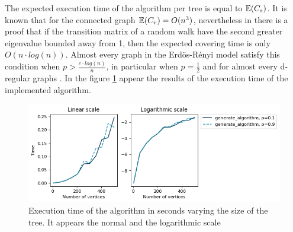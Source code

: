 The expected execution time of the algorithm per tree is equal to $\mathbb{E}(C_{s})$. It is known that for the connected graph $\mathbb{E}(C_{v}) = O(n^{3})$, nevertheless in \cite[Broder, Andrei 89]{boundsoncovertime} there is a proof that if the transition matrix of a random walk have the second greater eigenvalue bounded away from 1, then the expected covering time is only $O(n\cdot log(n))$. Almost every graph in the Erdös-Rényi model satisfy this condition when $p > \frac{c\cdot log(n)}{n}$, in particular when $p=\frac{1}{2}$ and for almost every d-regular graphs \cite[Friedman 89]{secondEigenValue}. 
In the figure \ref{fig:tiemposGEN} appear the results of the execution time of the implemented algorithm.
\begin{figure}[h!]
	\centering
	\includegraphics[scale=0.8]{Python/Figures/Time-execution-generate-algorithm.png}
	\caption{ Execution time of the algorithm in seconds varying the size of the tree. It appears the normal and the logarithmic scale}
	\label{fig:tiemposGEN}
\end{figure}
